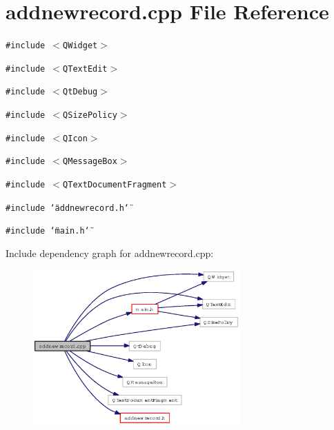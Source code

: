 \section{addnewrecord.cpp File Reference}
\label{addnewrecord_8cpp}
{\tt \#include $<$QWidget$>$}\par
{\tt \#include $<$QText\-Edit$>$}\par
{\tt \#include $<$Qt\-Debug$>$}\par
{\tt \#include $<$QSize\-Policy$>$}\par
{\tt \#include $<$QIcon$>$}\par
{\tt \#include $<$QMessage\-Box$>$}\par
{\tt \#include $<$QText\-Document\-Fragment$>$}\par
{\tt \#include \char`\"{}addnewrecord.h\char`\"{}}\par
{\tt \#include \char`\"{}main.h\char`\"{}}\par


Include dependency graph for addnewrecord.cpp:\begin{figure}[H]
\begin{center}
\leavevmode
\includegraphics[width=224pt]{addnewrecord_8cpp__incl}
\end{center}
\end{figure}
